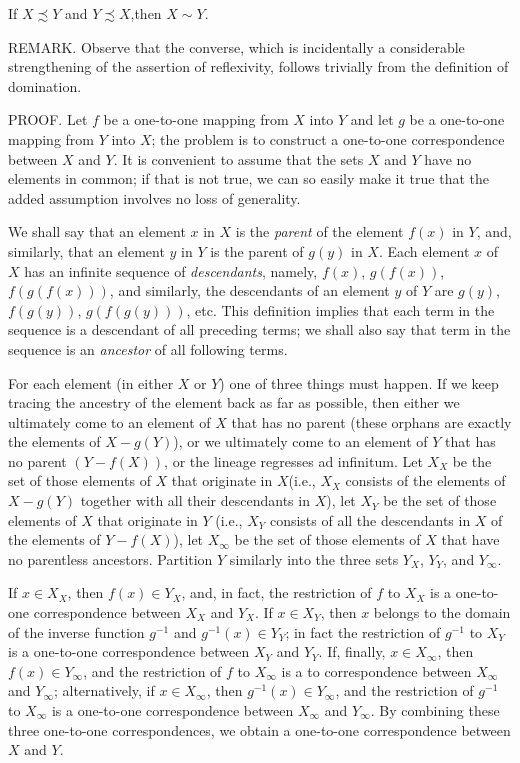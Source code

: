 \begin{named} If $X \precsim Y$ and $Y \precsim X$,then $X \sim Y$.
\end{named}

REMARK. Observe that the converse, which is incidentally a considerable strengthening of the assertion of reflexivity, follows trivially from the definition of domination. 

PROOF. Let $f$ be a one-to-one mapping from $X$ into $Y$ and let $g$ be a one-to-one mapping from $Y$ into $X$; the problem is to construct a one-to-one correspondence between $X$ and $Y$. It is convenient to assume that the sets $X$ and $Y$ have no elements in common; if that is not true, we can so easily make it true that the added assumption  involves no loss of generality. 

We shall say that an element $x$ in $X$ is the \textit{parent} of the element $f(x)$ in $Y$, and, similarly, that an element $y$ in $Y$ is the parent of $g(y)$ in $X$. Each element $x$ of $X$ has an infinite sequence of \textit{descendants}, namely, $f(x)$, $g(f(x))$, $f(g(f(x)))$, and similarly, the descendants of an element $y$ of $Y$ are $g(y)$, $f(g(y))$, $g(f(g(y)))$, etc. This definition implies that each term in the sequence is a descendant of all preceding terms; we shall also say that term in the sequence is an \textit{ancestor} of all following terms. 

For each element (in either $X$ or $Y$) one of three things must happen. If we keep tracing the ancestry of the element back as far as possible, then either we ultimately come to an element of $X$ that has no parent (these orphans are exactly the elements of $X - g(Y)$), or we ultimately come to an element of $Y$ that has no parent $(Y - f(X))$, or the lineage regresses ad infinitum. Let $X_{X}$ be the set of those elements of $X$ that originate in $X$(i.e., $X_{X}$ consists of the elements of $X - g(Y)$ together with all their descendants in $X$), let $X_{Y}$ be the set of those elements of $X$ that originate in $Y$ (i.e., $X_{Y}$ consists of all the descendants in $X$ of the elements of $Y - f(X)$), let $X_{\infty}$ be the set of those elements of $X$ that have no parentless ancestors. Partition $Y$ similarly into the three sets $Y_{X}$, $Y_{Y}$, and $Y_{\infty}$. 

If $x \in X_{X}$, then $f(x) \in Y_{X}$, and, in fact, the restriction of $f$ to $X_{X}$ is a one-to-one correspondence between $X_{X}$ and $Y_{X}$. If $x \in X_{Y}$, then $x$ belongs to the domain of the inverse function $g^{-1}$ and $g^{-1}(x) \in Y_{Y}$; in fact the restriction of $g^{-1}$ to $X_{Y}$ is a one-to-one correspondence between $X_{Y}$ and $Y_{Y}$. If, finally, $x \in X_{\infty}$, then $f(x) \in Y_{\infty}$, and the restriction of $f$ to $X_{\infty}$ is a to correspondence between $X_{\infty}$ and  $Y_{\infty}$; alternatively, if $x \in X_{\infty}$, then $g^{-1}(x) \in Y_{\infty}$, and the restriction of $g^{-1}$ to $X_{\infty}$ is a one-to-one correspondence between $X_{\infty}$ and $Y_{\infty}$. By combining these three one-to-one correspondences, we obtain a one-to-one correspondence between $X$ and $Y$. 


